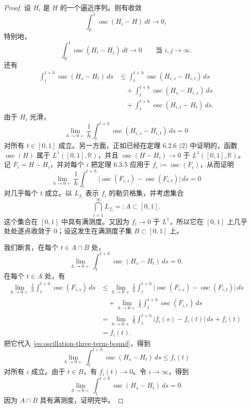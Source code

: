 \begin{proof}
设 $H_i$ 是 $H$ 的一个逼近序列。则有收敛
\[
 \int_0^1\operatorname{osc}(H_i-H)\,dt\longrightarrow0,
\]
特别地，
\[
 \int_0^1\operatorname{osc}(H_i-H_j)\,dt\longrightarrow0
 \qquad\text{当 }i,j\to\infty.
\]
还有
\begin{equation}
\begin{split}
 \int_t^{t+h}\operatorname{osc}(H_s-H_t)\,ds
 &\leq\int_t^{t+h}\operatorname{osc}(H_{i,s}-H_{i,t})\,ds\\
 &\quad+\int_t^{t+h}\operatorname{osc}(H_s-H_{i,s})\,ds\\
 &\quad+\int_t^{t+h}\operatorname{osc}(H_{i,t}-H_t)\,ds.
\end{split}
 \label{eq:oscillation-three-term-bound}
\end{equation}
由于 $H_i$ 光滑，
\[
 \lim_{h\to0+}\frac1h\int_t^{t+h}
 \operatorname{osc}(H_{i,s}-H_{i,t})\,ds=0
\]
对所有 $t\in[0,1]$ 成立。另一方面，正如已经在定理 6.2.6 (2) 中证明的，函数
$\operatorname{osc}(H)$ 属于 $L^1([0,1],\mathbb R)$，并且
$\operatorname{osc}(H-H_i)\to0$ 于
$L^1([0,1],\mathbb R)$。记 $F_i=H-H_i$，并对每个 $i$ 把定理
6.3.5 应用于 $f_i:=\operatorname{osc}(F_i)$，从而证明
\[
 \lim_{h\to0+}\frac1h\int_t^{t+h}
 \bigl|\operatorname{osc}(F_{i,s})-
 \operatorname{osc}(F_{i,t})\bigr|\,ds=0
\]
对几乎每个 $t$ 成立。以 $L_{f_i}$ 表示 $f_i$ 的勒贝格集，并考虑集合
\[
 \bigcap_{i=1}^{\infty}L_{f_i}=:A\subset[0,1].
\]
这个集合在 $[0,1]$ 中具有满测度。又因为 $f_i\to0$ 于
$L^1$，所以它在 $[0,1]$ 上几乎处处逐点收敛于 $0$；设这发生在满测度子集
$B\subset[0,1]$ 上。

我们断言，在每个 $t\in A\cap B$ 处，
\begin{equation}
 \lim_{h\to0+}\int_t^{t+h}
 \operatorname{osc}(H_s-H_t)\,ds=0.
 \label{eq:oscillation-lebesgue-claim}
\end{equation}
在每个 $t\in A$ 处，有
\[
\begin{aligned}
 \lim_{h\to0+}\frac1h\int_t^{t+h}\operatorname{osc}(F_{i,s})\,ds
 &\leq\lim_{h\to0+}\frac1h\int_t^{t+h}
 \bigl|\operatorname{osc}(F_{i,s})-\operatorname{osc}(F_{i,t})\bigr|\,ds\\
 &\quad+\lim_{h\to0+}\frac1h\int_t^{t+h}
 \operatorname{osc}(F_{i,t})\,ds\\
 &=\lim_{h\to0+}\frac1h\int_t^{t+h}|f_i(s)-f_i(t)|\,ds+f_i(t)\\
 &=f_i(t).
\end{aligned}
\]
把它代入 \eqref{eq:oscillation-three-term-bound}，得到
\[
 \lim_{h\to0+}\int_t^{t+h}
 \operatorname{osc}(H_s-H_t)\,ds\leq f_i(t)
\]
对所有 $i$ 成立。由于 $t\in B$，有 $f_i(t)\to0$。令
$i\to\infty$，得到
\[
 \lim_{h\to0+}\int_t^{t+h}
 \operatorname{osc}(H_s-H_t)\,ds=0.
\]
因为 $A\cap B$ 具有满测度，证明完毕。
\end{proof}


